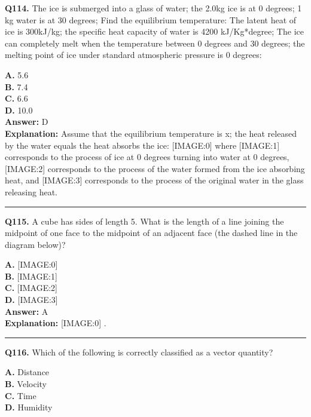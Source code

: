 \documentclass[12pt]{article}
\begin{document}
\noindent
\textbf{Q114.} The ice is submerged into a glass of water; the 2.0kg ice is at 0 degrees; 1 kg water is at 30 degrees; Find the equilibrium temperature: The latent heat of ice is 300kJ/kg; the specific heat capacity of water is 4200 kJ/Kg*degree; The ice can completely melt when the temperature between 0 degrees and 30 degrees; the melting point of ice under standard atmospheric pressure is 0 degrees:



\textbf{A.} 5.6 \\
\textbf{B.} 7.4 \\
\textbf{C.} 6.6 \\
\textbf{D.} 10.0 \\

\textbf{Answer:} D \\
\textbf{Explanation:} Assume that the equilibrium temperature is x; the heat released by the water equals the heat absorbs the ice:
[IMAGE:0]
where
[IMAGE:1]
corresponds to the process of ice at 0 degrees turning into water at 0 degrees,
[IMAGE:2]
corresponds to the process of the water formed from the ice absorbing heat, and
[IMAGE:3]
corresponds to the process of the original water in the glass releasing heat.

\hrule
\vspace{1em}


\noindent
\textbf{Q115.} A cube has sides of length 5. What is the length of a line joining the midpoint of one face to the midpoint of an adjacent face (the dashed line in the diagram below)?



\textbf{A.} [IMAGE:0] \\
\textbf{B.} [IMAGE:1] \\
\textbf{C.} [IMAGE:2] \\
\textbf{D.} [IMAGE:3] \\

\textbf{Answer:} A \\
\textbf{Explanation:} [IMAGE:0]
.

\hrule
\vspace{1em}


\noindent
\textbf{Q116.} Which of the following is correctly classified as a vector quantity?



\textbf{A.} Distance \\
\textbf{B.} Velocity \\
\textbf{C.} Time \\
\textbf{D.} Humidity \\
\end{document}
